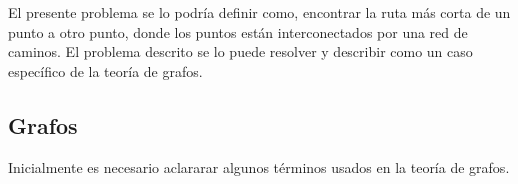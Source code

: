 El presente problema se lo podría definir como, encontrar la ruta más corta de un punto a otro punto, donde los puntos están interconectados por una red de caminos. El problema descrito se lo puede resolver y describir como un caso específico de la teoría de grafos.



  \subsection{Grafos} %
  \label{sec:teoria_grafos}


      Inicialmente es necesario aclararar algunos términos usados en la teoría de grafos.



